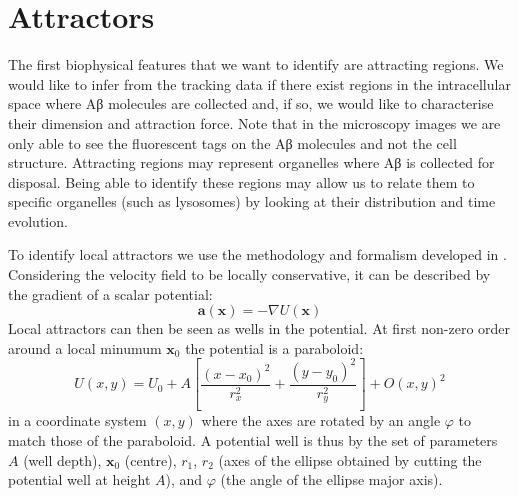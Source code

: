 %

\section{Attractors}\label{sec:attractors}

The first biophysical features that we want to identify are attracting regions. We would like to infer from the tracking data if there exist regions in the intracellular space where Aβ molecules are collected and, if so, we would like to characterise their dimension and attraction force. Note that in the microscopy images we are only able to see the fluorescent tags on the Aβ molecules and not the cell structure. Attracting regions may represent organelles where Aβ is collected for disposal. Being able to identify these regions may allow us to relate them to specific organelles (such as lysosomes) by looking at their distribution and time evolution.

To identify local attractors we use the methodology and formalism developed in . Considering the velocity field to be locally conservative, it can be described by the gradient of a scalar potential:
\begin{equation}
 \bm{a}(\bm{x}) = - \nabla U(\bm{x})
\end{equation}
Local attractors can then be seen as wells in the potential. At first non-zero order around a local minumum $\bm{x}_0$ the potential is a paraboloid:
\begin{equation} \label{eq:paraboloid}
 U(x, y) = U_0 + A\left[\frac{(x - x_0)^2}{r_x^2} + \frac{(y - y_0)^2}{r_y^2}\right] + O(x, y)^2
\end{equation}
in a coordinate system $(x, y)$ where the axes are rotated by an angle $\varphi$ to match those of the paraboloid. A potential well is thus by the set of parameters $A$ (well depth), $\bm{x}_0$ (centre), $r_1$, $r_2$ (axes of the ellipse obtained by cutting the potential well at height $A$), and $\varphi$ (the angle of the ellipse major axis).

